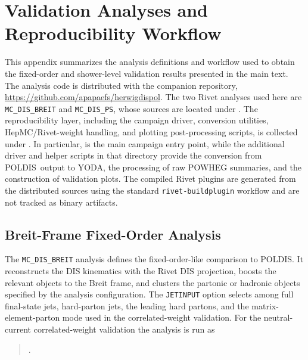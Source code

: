 \documentclass[a4paper,11pt]{article}
\newcommand{\POLDIS}{\textsc{POLDIS}}
\begin{document}
\section{Validation Analyses and Reproducibility Workflow}
\label{app:rivet-workflow}

This appendix summarizes the analysis definitions and workflow used to obtain
the fixed-order and shower-level validation results presented in the main text.
The analysis code is distributed with the companion repository,
\url{https://github.com/apapaefs/herwigdispol}. The two Rivet analyses used here
are \texttt{MC\_DIS\_BREIT} and \texttt{MC\_DIS\_PS}, whose sources are located
under . The reproducibility layer, including the
campaign driver, conversion utilities, HepMC/Rivet-weight handling, and plotting
post-processing scripts, is collected under .
In particular,  is the main campaign entry
point, while the additional driver and helper scripts in that directory provide
the conversion from \POLDIS\ output to YODA, the processing of raw POWHEG
summaries, and the construction of validation plots. The compiled Rivet plugins
are generated from the distributed sources using the standard
\texttt{rivet-buildplugin} workflow and are not tracked as binary artifacts.

\subsection{Breit-Frame Fixed-Order Analysis}

The \texttt{MC\_DIS\_BREIT} analysis defines the fixed-order-like comparison to
\POLDIS. It reconstructs the DIS kinematics with the Rivet DIS projection,
boosts the relevant objects to the Breit frame, and clusters the partonic or
hadronic objects specified by the analysis configuration. The \texttt{JETINPUT}
option selects among full final-state jets, hard-parton jets, the leading hard
partons, and the matrix-element-parton mode used in the correlated-weight
validation. For the neutral-current correlated-weight validation the analysis is
run as
\begin{quote}
\small{}.
\end{quote}
\end{document}
